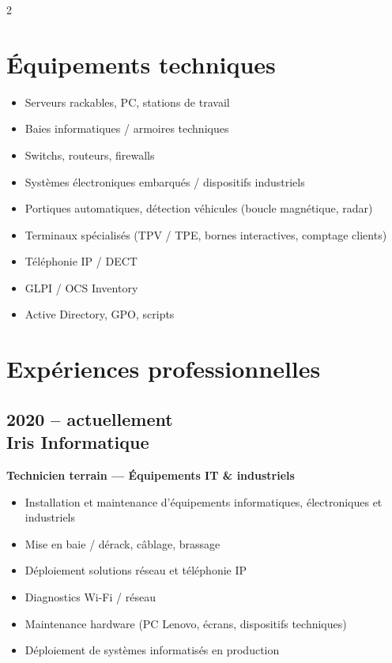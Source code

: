 \documentclass[11pt,a4paper]{article}
\begin{document}
\begin{paracol}{2}
\section*{Équipements techniques}
\begin{itemize}[leftmargin=*]
  \item Serveurs rackables, PC, stations de travail
  \item Baies informatiques / armoires techniques
  \item Switchs, routeurs, firewalls
  \item Systèmes électroniques embarqués / dispositifs industriels
  \item Portiques automatiques, détection véhicules (boucle magnétique, radar)
  \item Terminaux spécialisés (TPV / TPE, bornes interactives, comptage clients)
  \item Téléphonie IP / DECT
  \item GLPI / OCS Inventory
  \item Active Directory, GPO, scripts
\end{itemize}

\switchcolumn


\section*{Expériences professionnelles}

\subsection*{2020 -- actuellement \\ Iris Informatique}
\textbf{Technicien terrain — Équipements IT \& industriels}
\begin{itemize}[leftmargin=*]
  \item Installation et maintenance d'équipements informatiques, électroniques et industriels
  \item Mise en baie / dérack, câblage, brassage
  \item Déploiement solutions réseau et téléphonie IP
  \item Diagnostics Wi-Fi / réseau
  \item Maintenance hardware (PC Lenovo, écrans, dispositifs techniques)
  \item Déploiement de systèmes informatisés en production
\end{itemize}


\end{paracol}
\end{document}
